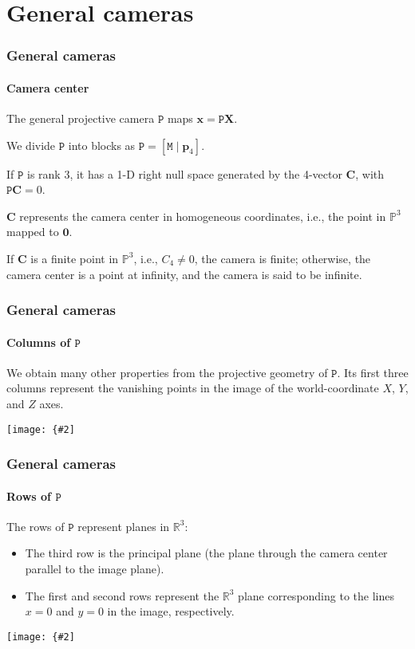 \documentclass[aspectratio=169]{beamer}
\renewcommand{\vec}[1]{\boldsymbol{#1}}
\newcommand{\mat}[1]{\mathtt{#1}}
\def\Rset{\mathbb{R}}
\def\Pset{\mathbb{P}}
\newcommand{\myfig}[3]{\centerline{\texttt{[image: \{\#2]}}}
    \centerline{\scriptsize #3}}
\begin{document}
\section{General cameras}

\begin{frame}
\frametitle{General cameras}
\framesubtitle{Camera center}

The general projective camera $\mat{P}$ maps $\vec{x}=\mat{P}\vec{X}$.

\medskip

We divide $\mat{P}$ into blocks as $\mat{P}=[\mat{M} \mid \vec{p}_4]$.

\medskip

If $\mat{P}$ is rank 3, it has a 1-D right null space generated by the
4-vector $\vec{C}$, with $\mat{P}\vec{C}=0$.

\medskip

$\vec{C}$ represents the \alert{camera center} in homogeneous
coordinates, i.e., the point in $\Pset^3$ mapped to $\vec{0}$.

\medskip

If $\vec{C}$ is a \alert{finite} point in $\Pset^3$, i.e., $C_4 \not=
0$, the camera is \alert{finite}; otherwise, the camera center is a
\alert{point at infinity}, and the camera is said to be
\alert{infinite}.

\end{frame}

\begin{frame}
\frametitle{General cameras}
\framesubtitle{Columns of $\mat{P}$}

We obtain many other properties from the projective geometry of
$\mat{P}$.  Its \alert{first three columns} represent the vanishing
points in the image of the world-coordinate $X$, $Y$, and $Z$ axes.

\medskip

\myfig{4in}{HZ-fig5-4}{Hartley and Zisserman, Fig.\ 6.4}

\end{frame}

\begin{frame}
\frametitle{General cameras}
\framesubtitle{Rows of $\mat{P}$}

The \alert{rows} of $\mat{P}$ represent planes in $\Rset^3$:
\begin{itemize}
\item The \alert{third row} is the \alert{principal plane} (the plane
  through the camera center parallel to the image plane).
\item The \alert{first and second rows} represent the $\Rset^3$ plane
  corresponding to the lines $x=0$ and $y=0$ in the image,
  respectively.
\end{itemize}

\medskip

\myfig{3.6in}{HZ-fig5-5}{Hartley and Zisserman, Fig.\ 6.5}

\end{frame}
\end{document}
